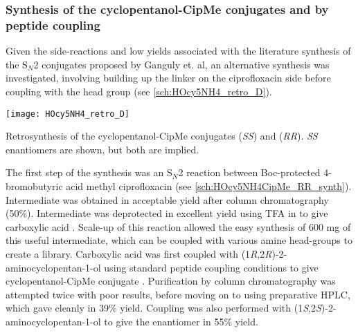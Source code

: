 \subsubsection{Synthesis of the cyclopentanol-CipMe conjugates   and  by peptide coupling\label{sec:CipMe_linker}}

Given the side-reactions and low yields associated with the literature synthesis of the S$_N$2 conjugates proposed by Ganguly et. al\cite{Ganguly2011}, an alternative synthesis was investigated, involving building up the linker on the ciprofloxacin side before coupling with the head group (see \ref{sch:HOcy5NH4_retro_D}).


\begin{scheme}[H]
	\begin{center}
		\texttt{[image: HOcy5NH4\_retro\_D]}
		\caption{Retrosynthesis of the cyclopentanol-CipMe conjugates   (\textit{SS}) and  (\textit{RR}). \textit{SS} enantiomers are shown, but both are implied.\label{sch:HOcy5NH4_retro_D}}
	\end{center}
\end{scheme}

The first step of the synthesis was an S$_N$2 reaction between Boc-protected 4-bromobutyric acid  methyl ciprofloxacin  (see \ref{sch:HOcy5NH4CipMe_RR_synth}). Intermediate  was obtained in acceptable yield after column chromatography (50\%).
Intermediate  was deprotected in excellent yield using TFA in  to give carboxylic acid . Scale-up of this reaction allowed the easy synthesis of 600 mg of this useful intermediate, which can be coupled with various amine head-groups to create a library.
Carboxylic acid  was first coupled with (1\textit{R},2\textit{R})-2-aminocyclopentan-1-ol  using standard peptide coupling conditions to give cyclopentanol-CipMe conjugate . Purification by column chromatography was attempted twice with poor results, before moving on to using preparative HPLC, which gave  cleanly in 39\% yield.
Coupling was also performed with (1\textit{S},2\textit{S})-2-aminocyclopentan-1-ol  to give the enantiomer  in 55\% yield.



